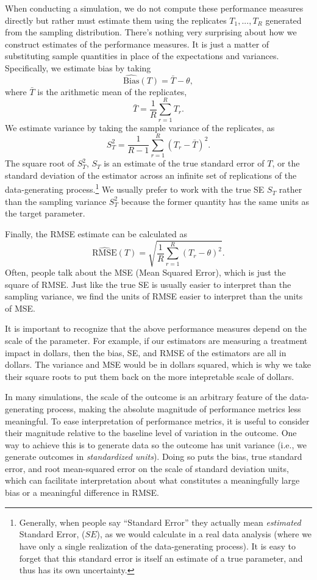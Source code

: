 \documentclass[
]{book}
\newcommand{\Bias}{\text{Bias}}
\newcommand{\RMSE}{\text{RMSE}}
\begin{document}
When conducting a simulation, we do not compute these performance measures directly but rather must estimate them using the replicates \(T_1,...,T_R\) generated from the sampling distribution.
There's nothing very surprising about how we construct estimates of the performance measures.
It is just a matter of substituting sample quantities in place of the expectations and variances.
Specifically, we estimate bias by taking
\[
\widehat{\Bias}(T) = \bar{T} - \theta, \label{eq:bias-estimator}
\]
where \(\bar{T}\) is the arithmetic mean of the replicates,
\[ 
\bar{T} = \frac{1}{R}\sum_{r=1}^R T_r.
\]
We estimate variance by taking the sample variance of the replicates, as
\[
S_T^2 = \frac{1}{R - 1}\sum_{r=1}^R \left(T_r - \bar{T}\right)^2. \label{eq:var-estimator}
\]
The square root of \(S^2_T\), \(S_T\) is an estimate of the true standard error of \(T\), or the standard deviation of the estimator across an infinite set of replications of the data-generating process.\footnote{Generally, when people say ``Standard Error'' they actually mean \emph{estimated} Standard Error, (\(\widehat{SE}\)), as we would calculate in a real data analysis (where we have only a single realization of the data-generating process). It is easy to forget that this standard error is itself an estimate of a true parameter, and thus has its own uncertainty.}
We usually prefer to work with the true SE \(S_T\) rather than the sampling variance \(S_T^2\) because the former quantity has the same units as the target parameter.

Finally, the RMSE estimate can be calculated as
\[ 
\widehat{\RMSE}(T) = \sqrt{\frac{1}{R} \sum_{r = 1}^R \left( T_r - \theta\right)^2 }.  \label{eq:rmse-estimator}
\]
Often, people talk about the MSE (Mean Squared Error), which is just the square of RMSE.
Just like the true SE is usually easier to interpret than the sampling variance, we find the units of RMSE easier to interpret than the units of MSE.

It is important to recognize that the above performance measures depend on the scale of the parameter.
For example, if our estimators are measuring a treatment impact in dollars, then the bias, SE, and RMSE of the estimators are all in dollars.
The variance and MSE would be in dollars squared, which is why we take their square roots to put them back on the more intepretable scale of dollars.

In many simulations, the scale of the outcome is an arbitrary feature of the data-generating process, making the absolute magnitude of performance metrics less meaningful.
To ease interpretation of performance metrics, it is useful to consider their magnitude relative to the baseline level of variation in the outcome.
One way to achieve this is to generate data so the outcome has unit variance (i.e., we generate outcomes in \emph{standardized units}).
Doing so puts the bias, true standard error, and root mean-squared error on the scale of standard deviation units, which can facilitate interpretation about what constitutes a meaningfully large bias or a meaningful difference in RMSE.
\end{document}
